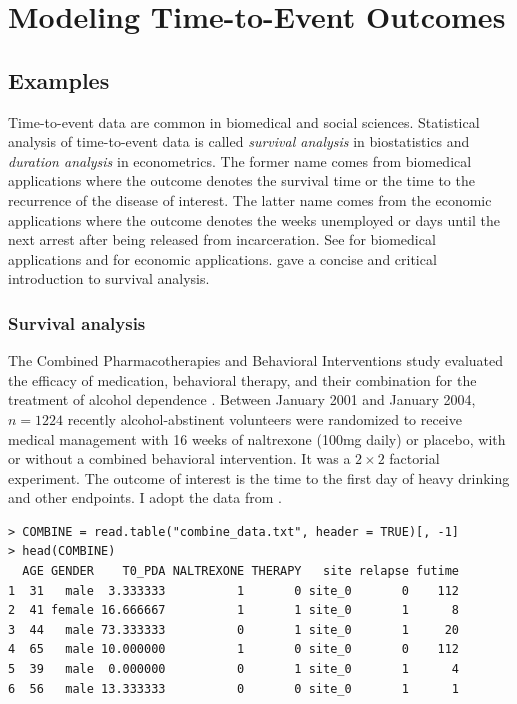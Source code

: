 

\chapter{Modeling Time-to-Event Outcomes}
 \label{chapter::survival-analysis}


\section{Examples}
Time-to-event data are common in biomedical and social sciences. Statistical analysis of time-to-event data is called
{\it survival analysis} in biostatistics and {\it duration analysis} in econometrics.
The former name comes from biomedical applications where the outcome
denotes the survival time or the time to the recurrence of the disease of interest. The
latter name comes from the economic applications where the outcome
denotes the weeks unemployed or days until the next arrest after being released from incarceration. See \citet{kalbfleisch2011statistical} for biomedical applications and \citet{heckman1984econometric} for economic applications. \citet{freedman2008survival} gave a concise and critical introduction to survival analysis. 



\subsection{Survival analysis}

The Combined Pharmacotherapies and Behavioral Interventions study evaluated the efficacy of medication, behavioral therapy, and their combination for the treatment of alcohol dependence \citep{anton2006combined}. Between January 2001 and January 2004, $n=1224$ recently alcohol-abstinent volunteers were randomized to receive medical management with 16 weeks of naltrexone (100mg daily) or placebo, with or without a combined behavioral intervention. It was a $2\times 2$ factorial experiment. The outcome of interest is the time to the first day of heavy drinking and other endpoints. I adopt the data from \citet{lin2016simultaneous}. 

\begin{lstlisting}
> COMBINE = read.table("combine_data.txt", header = TRUE)[, -1]
> head(COMBINE)
  AGE GENDER    T0_PDA NALTREXONE THERAPY   site relapse futime
1  31   male  3.333333          1       0 site_0       0    112
2  41 female 16.666667          1       1 site_0       1      8
3  44   male 73.333333          0       1 site_0       1     20
4  65   male 10.000000          1       0 site_0       0    112
5  39   male  0.000000          0       1 site_0       1      4
6  56   male 13.333333          0       0 site_0       1      1
\end{lstlisting}

